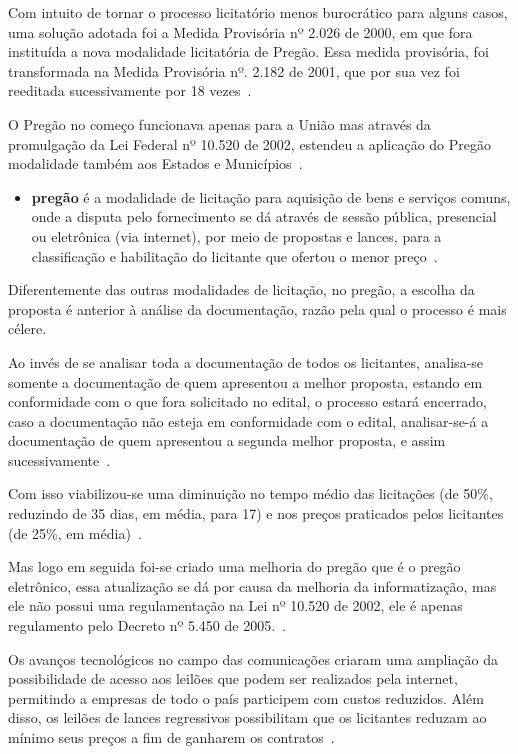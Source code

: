 Com intuito de tornar o processo licitatório menos burocrático para alguns casos, uma solução adotada foi a Medida Provisória nº 2.026 de 2000, em que fora instituída a nova modalidade licitatória de Pregão. 
Essa medida provisória, foi transformada na Medida Provisória nº. 2.182 de 2001, que por sua vez foi reeditada sucessivamente por 18 vezes~\cite{ribeiro2007evoluccao}. 

O Pregão no começo funcionava apenas para a União mas através da promulgação da Lei Federal nº 10.520 de 2002, estendeu a aplicação do Pregão modalidade também aos Estados e Municípios~\cite{ribeiro2007evoluccao}.

\begin{itemize}
    \item \textbf{pregão} é a modalidade de licitação para aquisição de bens e serviços comuns, onde a disputa pelo fornecimento se dá através de sessão pública, presencial ou eletrônica (via internet), por meio de propostas e lances, para a classificação e habilitação do licitante que ofertou o menor preço~\cite{barreto2008licitaccoes}.
\end{itemize}

Diferentemente das outras modalidades de licitação, no pregão, a escolha da proposta é anterior à análise da documentação, razão pela qual o processo é mais célere. 

Ao invés de se analisar toda a documentação de todos os licitantes, analisa-se somente a documentação de quem apresentou a melhor proposta, estando em conformidade com o que fora solicitado no edital, o processo estará encerrado, caso a documentação não esteja em conformidade com o edital, analisar-se-á a documentação de quem apresentou a segunda melhor proposta, e assim sucessivamente~\cite{gasparini2017direito}.

Com isso viabilizou-se uma diminuição no tempo médio das licitações (de 50\%, reduzindo de 35 dias, em média, para 17)
e nos preços praticados pelos licitantes (de 25\%, em média)~\cite{mello2016licitaccao}. 

Mas logo em seguida foi-se criado uma melhoria do pregão que é o pregão eletrônico, essa atualização se dá por causa da melhoria da informatização, mas ele não possui uma regulamentação na Lei nº 10.520 de 2002, ele é apenas regulamento pelo Decreto nº 5.450 de 2005.~\cite{dapregao}.

Os avanços tecnológicos no campo das comunicações criaram uma ampliação da possibilidade de acesso aos leilões que podem ser realizados pela internet, permitindo a empresas de todo o país participem com custos reduzidos.
Além disso, os leilões de lances regressivos possibilitam que os licitantes reduzam ao mínimo seus preços a fim de ganharem os contratos~\cite{mello2016licitaccao}.

